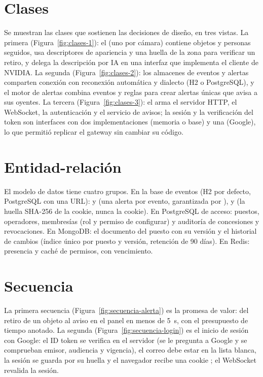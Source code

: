 \section{Clases}
Se muestran las clases que sostienen las decisiones de diseño, en tres vistas. La primera (Figura~\ref{fig:clases-1}): el
 (uno por cámara) contiene objetos y personas seguidos, usa descriptores de apariencia y una huella de la zona para
verificar un retiro, y delega la descripción por IA en una interfaz que implementa el cliente de NVIDIA. La segunda (Figura~\ref{fig:clases-2}):
los almacenes de eventos y alertas comparten conexión con reconexión automática y dialecto (H2 o PostgreSQL), y el motor de alertas combina
eventos y reglas para crear alertas únicas que avisa a sus oyentes. La tercera (Figura~\ref{fig:clases-3}): el  arma el
servidor HTTP, el WebSocket, la autenticación y el servicio de avisos; la sesión y la verificación del token son interfaces con dos
implementaciones (memoria o base) y una (Google), lo que permitió replicar el gateway sin cambiar su código.


\section{Entidad-relación}
El modelo de datos tiene cuatro grupos. En la base de eventos (H2 por defecto, PostgreSQL con una URL):  y
 (una alerta por evento, garantizada por ),  y  (la huella SHA-256 de la cookie, nunca la
cookie). En PostgreSQL de acceso: puestos, operadores, membresías (rol y permiso de configurar) y auditoría de concesiones y revocaciones. En MongoDB:
el documento del puesto con su versión y el historial de cambios (índice único por puesto y versión, retención de 90 días). En Redis: presencia y
caché de permisos, con vencimiento.


\section{Secuencia}
La primera secuencia (Figura~\ref{fig:secuencia-alerta}) es la promesa de valor: del retiro de un objeto al aviso en el panel en menos de
5~s, con el presupuesto de tiempo anotado. La segunda (Figura~\ref{fig:secuencia-login}) es el inicio de sesión con Google: el ID token se
verifica en el servidor (se le pregunta a Google y se comprueban emisor, audiencia y vigencia), el correo debe estar en la lista blanca, la sesión se guarda por su huella y el
navegador recibe una cookie ; el WebSocket revalida la sesión.

